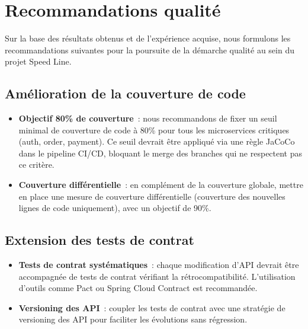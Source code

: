\section{Recommandations qualit\'{e}}
\label{sec:recommandations}

Sur la base des r\'{e}sultats obtenus et de l'exp\'{e}rience acquise, nous
formulons les recommandations suivantes pour la poursuite de la
d\'{e}marche qualit\'{e} au sein du projet Speed Line.

\subsection{Am\'{e}lioration de la couverture de code}

\begin{itemize}[leftmargin=*]
  \item \textbf{Objectif 80\% de couverture}~: nous recommandons de fixer
    un seuil minimal de couverture de code \`{a} 80\% pour tous les
    microservices critiques (auth, order, payment). Ce seuil devrait
    \^{e}tre appliqu\'{e} via une r\`{e}gle JaCoCo dans le pipeline CI/CD, bloquant
    le merge des branches qui ne respectent pas ce crit\`{e}re.
  \item \textbf{Couverture diff\'{e}rentielle}~: en compl\'{e}ment de la
    couverture globale, mettre en place une mesure de couverture
    diff\'{e}rentielle (couverture des nouvelles lignes de code uniquement),
    avec un objectif de 90\%.
\end{itemize}

\subsection{Extension des tests de contrat}

\begin{itemize}[leftmargin=*]
  \item \textbf{Tests de contrat syst\'{e}matiques}~: chaque modification
    d'API devrait \^{e}tre accompagn\'{e}e de tests de contrat v\'{e}rifiant la
    r\'{e}trocompatibilit\'{e}. L'utilisation d'outils comme Pact ou Spring
    Cloud Contract est recommand\'{e}e.
  \item \textbf{Versioning des API}~: coupler les tests de contrat avec
    une strat\'{e}gie de versioning des API pour faciliter les \'{e}volutions
    sans r\'{e}gression.
\end{itemize}

